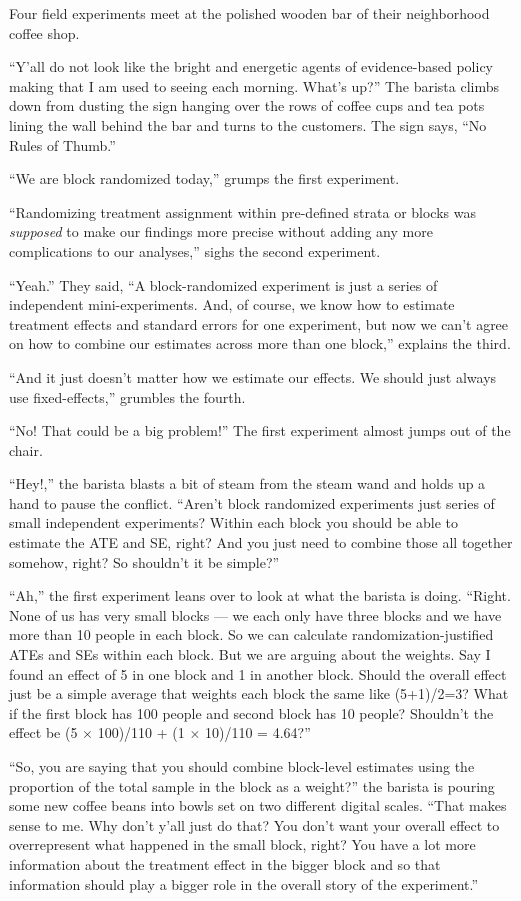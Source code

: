 \documentclass[
]{article}
\author{}
\date{\vspace{-2.5em}}
\begin{document}
Four field experiments meet at the polished wooden bar of their neighborhood coffee shop.

``Y'all do not look like the bright and energetic agents of evidence-based
policy making that I am used to seeing each morning. What's up?'' The barista
climbs down from dusting the sign hanging over the rows of coffee cups and tea
pots lining the wall behind the bar and turns to the customers. The sign says,
``No Rules of Thumb.''

``We are block randomized today,'' grumps the first experiment.

``Randomizing treatment assignment within pre-defined strata or blocks was
\emph{supposed} to make our findings more precise without adding any more
complications to our analyses,'' sighs the second experiment.

``Yeah.'' They said, ``A block-randomized experiment is just a series of
independent mini-experiments. And, of course, we know how to estimate
treatment effects and standard errors for one experiment, but now we can't
agree on how to combine our estimates across more than one block,'' explains the
third.

``And it just doesn't matter how we estimate our effects. We should just always use fixed-effects,'' grumbles the fourth.

``No! That could be a big problem!'' The first experiment almost jumps out of the chair.

``Hey!,'' the barista blasts a bit of steam from the steam wand and holds up a
hand to pause the conflict. ``Aren't block randomized experiments just series of
small independent experiments? Within each block you should be able to estimate
the ATE and SE, right? And you just need to combine those all together somehow,
right? So shouldn't it be simple?''

``Ah,'' the first experiment leans over to look at what the barista is doing.
``Right. None of us has very small blocks --- we each only have three blocks
and we have more than 10 people in each block. So we can calculate
randomization-justified ATEs and SEs within each block. But we are arguing
about the weights. Say I found an effect of 5 in one block and 1 in another
block. Should the overall effect just be a simple average that weights each block the same like (5+1)/2=3? What if the first block
has 100 people and second block has 10 people? Shouldn't the effect be (5
\(\times\) 100)/110 + (1 \(\times\) 10)/110 = 4.64?''

``So, you are saying that you should combine block-level estimates using the
proportion of the total sample in the block as a weight?'' the barista is
pouring some new coffee beans into bowls set on two different digital scales. ``That makes sense
to me. Why don't y'all just do that? You don't want your overall effect to
overrepresent what happened in the small block, right? You have a lot more
information about the treatment effect in the bigger block and so that
information should play a bigger role in the overall story of the experiment.''
\end{document}
